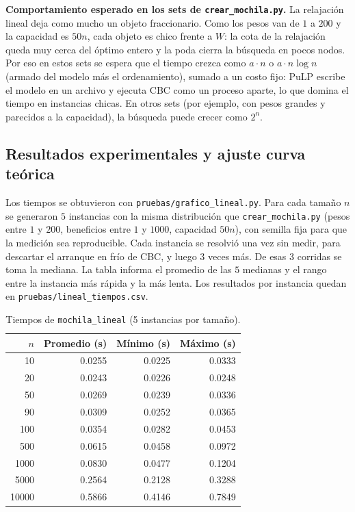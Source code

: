 \documentclass[11pt,a4paper]{article}
\begin{document}
\textbf{Comportamiento esperado en los sets de \texttt{crear\_mochila.py}.} La relajación lineal deja como mucho un objeto fraccionario. Como los pesos van de $1$ a $200$ y la capacidad es $50n$, cada objeto es chico frente a $W$: la cota de la relajación queda muy cerca del óptimo entero y la poda cierra la búsqueda en pocos nodos. Por eso en estos sets se espera que el tiempo crezca como $a \cdot n$ o $a \cdot n \log n$ (armado del modelo más el ordenamiento), sumado a un costo fijo: PuLP escribe el modelo en un archivo y ejecuta CBC como un proceso aparte, lo que domina el tiempo en instancias chicas. En otros sets (por ejemplo, con pesos grandes y parecidos a la capacidad), la búsqueda puede crecer como $2^n$.

\subsection{Resultados experimentales y ajuste curva teórica}
Los tiempos se obtuvieron con \texttt{pruebas/grafico\_lineal.py}. Para cada tamaño $n$ se generaron $5$ instancias con la misma distribución que \texttt{crear\_mochila.py} (pesos entre $1$ y $200$, beneficios entre $1$ y $1000$, capacidad $50n$), con semilla fija para que la medición sea reproducible. Cada instancia se resolvió una vez sin medir, para descartar el arranque en frío de CBC, y luego $3$ veces más. De esas $3$ corridas se toma la mediana. La tabla informa el promedio de las $5$ medianas y el rango entre la instancia más rápida y la más lenta. Los resultados por instancia quedan en \texttt{pruebas/lineal\_tiempos.csv}.

\begin{table}[h!]
    \centering
    \begin{tabular}{@{}rrrr@{}}
        \toprule
        \textbf{$n$} & \textbf{Promedio (s)} & \textbf{Mínimo (s)} & \textbf{Máximo (s)} \\ \midrule
        10    & 0.0255 & 0.0225 & 0.0333 \\
        20    & 0.0243 & 0.0226 & 0.0248 \\
        50    & 0.0269 & 0.0239 & 0.0336 \\
        90    & 0.0309 & 0.0252 & 0.0365 \\
        100   & 0.0354 & 0.0282 & 0.0453 \\
        500   & 0.0615 & 0.0458 & 0.0972 \\
        1000  & 0.0830 & 0.0477 & 0.1204 \\
        5000  & 0.2564 & 0.2128 & 0.3288 \\
        10000 & 0.5866 & 0.4146 & 0.7849 \\ \bottomrule
    \end{tabular}
    \caption{Tiempos de \texttt{mochila\_lineal} (5 instancias por tamaño).}
    \label{tab:pl_tiempos}
\end{table}
\end{document}
